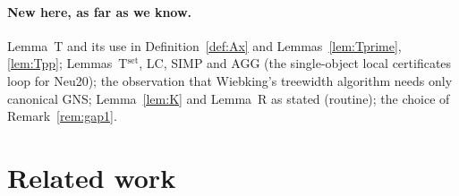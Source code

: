 \documentclass[11pt]{article}
\theoremstyle{plain}
\theoremstyle{definition}
\theoremstyle{remark}
\theoremstyle{named}
\theoremstyle{namedrm}
\begin{document}
\paragraph{New here, as far as we know.} Lemma~T and its use in Definition~\ref{def:Ax} and
Lemmas~\ref{lem:Tprime}, \ref{lem:Tpp}; Lemmas~T$^{\text{set}}$, LC, SIMP and AGG (the single-object local
certificates loop for Neu20); the observation that Wiebking's treewidth algorithm needs only canonical GNS;
Lemma~\ref{lem:K} and Lemma~R as stated (routine); the choice of Remark~\ref{rem:gap1}.

\section{Related work}\label{sec:related}
\end{document}
